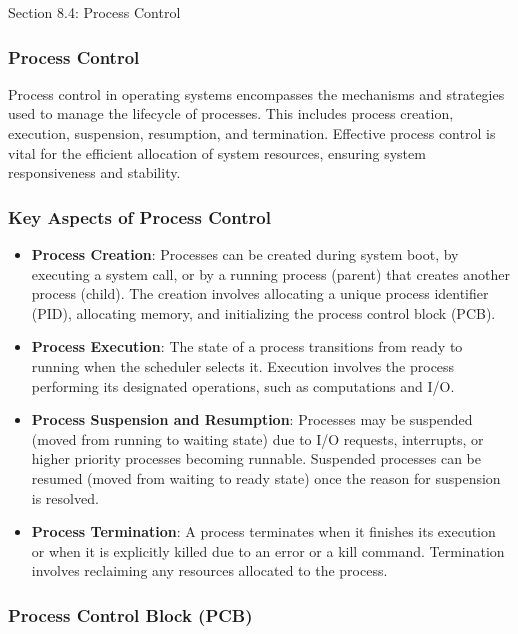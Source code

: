 \begin{notes}{Section 8.4: Process Control}
    \subsubsection*{Process Control}

    Process control in operating systems encompasses the mechanisms and strategies used to manage the lifecycle of processes. This includes process creation, execution, suspension, resumption, and 
    termination. Effective process control is vital for the efficient allocation of system resources, ensuring system responsiveness and stability. \vspace*{1em}
    
    \subsubsection*{Key Aspects of Process Control}
    
    \begin{itemize}
        \item \textbf{Process Creation}: Processes can be created during system boot, by executing a system call, or by a running process (parent) that creates another process (child). The creation 
        involves allocating a unique process identifier (PID), allocating memory, and initializing the process control block (PCB).
        \item \textbf{Process Execution}: The state of a process transitions from ready to running when the scheduler selects it. Execution involves the process performing its designated operations, 
        such as computations and I/O.
        \item \textbf{Process Suspension and Resumption}: Processes may be suspended (moved from running to waiting state) due to I/O requests, interrupts, or higher priority processes becoming runnable. 
        Suspended processes can be resumed (moved from waiting to ready state) once the reason for suspension is resolved.
        \item \textbf{Process Termination}: A process terminates when it finishes its execution or when it is explicitly killed due to an error or a kill command. Termination involves reclaiming any 
        resources allocated to the process.
    \end{itemize}
    
    \subsubsection*{Process Control Block (PCB)}
    

\end{notes}

